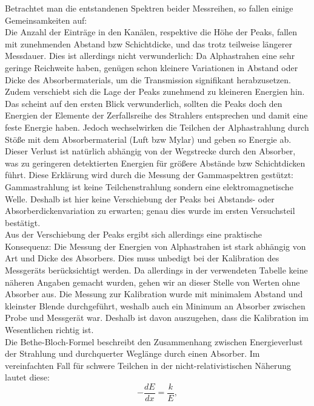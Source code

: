 Betrachtet man die entstandenen Spektren beider Messreihen, so fallen einige Gemeinsamkeiten auf:\\
Die Anzahl der Einträge in den Kanälen, respektive die Höhe der Peaks, fallen mit zunehmenden Abstand bzw Schichtdicke, und das trotz 
teilweise längerer Messdauer. Dies ist allerdings nicht verwunderlich: Da Alphastrahen eine sehr geringe Reichweite haben, genügen schon 
kleinere Variationen in Abstand oder Dicke des Absorbermaterials, um die Transmission signifikant herabzusetzen.\\
Zudem verschiebt sich die Lage der Peaks zunehmend zu kleineren Energien hin. Das scheint auf den ersten Blick verwunderlich, sollten 
die Peaks doch den Energien der Elemente der Zerfallsreihe des Strahlers entsprechen und damit eine feste Energie haben. Jedoch 
wechselwirken die Teilchen der Alphastrahlung durch Stöße mit dem Absorbermaterial (Luft bzw Mylar) und geben so Energie ab. Dieser 
Verlust ist natürlich abhängig von der Wegstrecke durch den Absorber, was zu geringeren detektierten Energien für größere Abstände 
bzw Schichtdicken führt. Diese Erklärung wird durch die Messung der Gammaspektren gestützt: Gammastrahlung ist keine Teilchenstrahlung 
sondern eine elektromagnetische Welle. Deshalb ist hier keine Verschiebung der Peaks bei Abstands- oder Absorberdickenvariation zu 
erwarten; genau dies wurde im ersten Versuchsteil bestätigt.\\
Aus der Verschiebung der Peaks ergibt sich allerdings eine praktische Konsequenz: Die Messung der Energien von Alphastrahen ist stark 
abhängig von Art und Dicke des Absorbers. Dies muss unbedigt bei der Kalibration des Messgeräts berücksichtigt werden. Da allerdings 
in der verwendeten Tabelle keine näheren Angaben gemacht wurden, gehen wir an dieser Stelle von Werten ohne Absorber aus. Die Messung 
zur Kalibration wurde mit minimalem Abstand und kleinster Blende durchgeführt, weshalb auch ein Minimum an Absorber zwischen Probe 
und Messgerät war. Deshalb ist davon auszugehen, dass die Kalibration im Wesentlichen richtig ist.\\

Die Bethe-Bloch-Formel beschreibt den Zusammenhang zwischen Energieverlust der Strahlung und durchquerter Weglänge durch einen Absorber. 
Im vereinfachten Fall für schwere Teilchen in der nicht-relativistischen Näherung lautet diese: \\

\begin{equation}
    - \frac{dE}{dx} = \frac{k}{E}, 
\end{equation}

